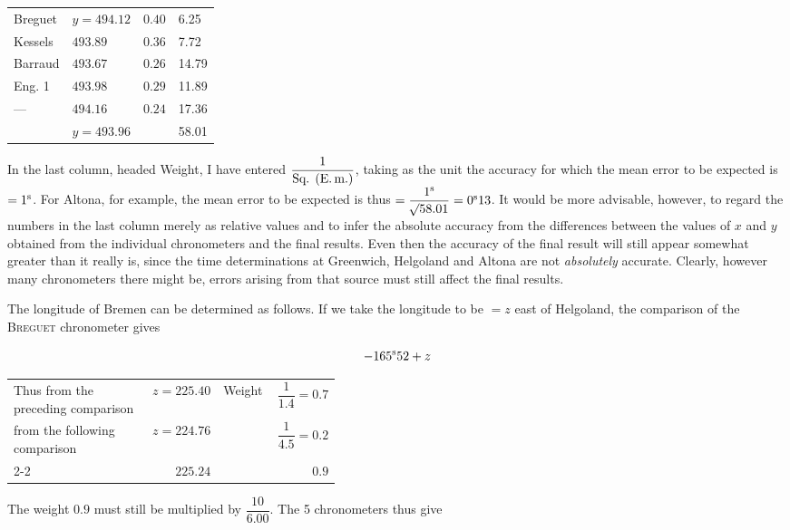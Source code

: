 \begin{center}
\begin{tabular}{ll|l|l}
Breguet & $y=494.12$ & $0.40$ & 6.25 \\
Kessels & $493.89$ & $0.36$ & 7.72 \\
Barraud & $493.67$ & $0.26$ & 14.79 \\
Eng. 1 & $493.98$ & $0.29$ & 11.89 \\
---\quad 4 & $494.16$ & $0.24$ & 17.36 \\
\hline
 & $y=493.96$ & & 58.01 \\
\end{tabular}
\end{center}

In the last column, headed Weight, I have entered $\dfrac{1}{\text{Sq. (E.\,m.)}}$, taking as the unit the accuracy for which the mean error to be expected is $=1^{\rm s}$. For Altona, for example, the mean error to be expected is thus $=\dfrac{1^{\rm s}}{\mathord{{}^{}\!\surd}58.01}=0^{\rm s}13$. It would be more advisable, however, to regard the numbers in the last column merely as relative values and to infer the absolute accuracy from the differences between the values of $x$ and $y$ obtained from the individual chronometers and the final results. Even then the accuracy of the final result will still appear somewhat greater than it really is, since the time determinations at Greenwich, Helgoland and Altona are not \emph{absolutely} accurate. Clearly, however many chronometers there might be, errors arising from that source must still affect the final results.

The longitude of Bremen can be determined as follows. If we take the longitude to be $=z$ east of Helgoland, the comparison of the \textsc{Breguet} chronometer gives

\[
-165^{\rm s}52+z
\]


\begin{center}\small
\begin{tabular}{p{0.42\linewidth} r l r}
Thus from the preceding comparison & $z=225.40$ & Weight & $\dfrac{1}{1.4}=0.7$ \\[5pt]
from the following comparison & $z=224.76$ & & $\dfrac{1}{4.5}=0.2$ \\[8pt]
\cline{2-2}\cline{4-4}
 & $225.24$ & & $0.9$ \\
\end{tabular}
\end{center}

The weight $0.9$ must still be multiplied by $\dfrac{10}{6.00}$. The 5 chronometers thus give

